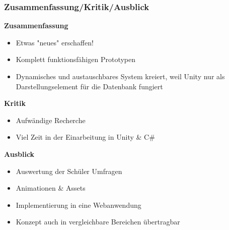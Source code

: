 \documentclass{beamer}
\begin{document}
\begin{frame}
\frametitle{Zusammenfassung/Kritik/Ausblick}
\textbf{Zusammenfassung}
\begin{itemize}
\item {Etwas "neues" erschaffen!}
\item {Komplett funktionsfähigen Prototypen}
\item {Dynamisches und austauschbares System kreiert, weil Unity nur als Darstellungselement für die Datenbank fungiert}
\end{itemize}
\textbf{Kritik}
\begin{itemize}
\item {Aufwändige Recherche}
\item {Viel Zeit in der Einarbeitung in Unity \& C\#}
\end{itemize}
\textbf{Ausblick}
\begin{itemize}
\item {Auswertung der Schüler Umfragen}
\item {Animationen \& Assets}
\item {Implementierung in eine Webanwendung}
\item {Konzept auch in vergleichbare Bereichen übertragbar}
\end{itemize}
\end{frame}
\end{document}
